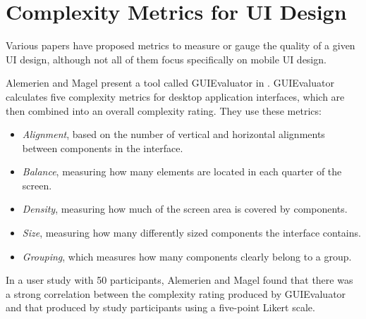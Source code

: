 \documentclass[11pt,titlepage,oneside,openany]{book}
\begin{document}
\section{Complexity Metrics for UI Design}\label{sec:metrics}

Various papers have proposed metrics to measure or gauge the quality of a given UI design, although not all of them focus specifically on mobile UI design. 

Alemerien and Magel present a tool called GUIEvaluator in \cite{alemerien_guievaluator_2014}. GUIEvaluator calculates five complexity metrics for desktop application interfaces, which are then combined into an overall complexity rating. They use these metrics:
\begin{itemize}
	\item \emph{Alignment}, based on the number of vertical and horizontal alignments between components in the interface.
	\item \emph{Balance}, measuring how many elements are located in each quarter of the screen.
	\item \emph{Density}, measuring how much of the screen area is covered by components.
	\item \emph{Size}, measuring how many differently sized components the interface contains.
	\item \emph{Grouping}, which measures how many components clearly belong to a group.
\end{itemize}
In a user study with 50 participants, Alemerien and Magel found that there was a strong correlation between the complexity rating produced by GUIEvaluator and that produced by study participants using a five-point Likert scale.
\end{document}
